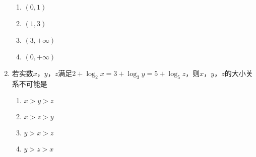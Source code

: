 \documentclass[UTF8]{ctexart}
\begin{document}
\begin{enumerate}
		\begin{enumerate}[label = A.]
			\item \((0,1)\)
			\item \((1,3)\)
			\item \((3,+\infty)\)
			\item \((0,+\infty)\)
		\end{enumerate}
		\item 若实数\(x\)，\(y\)，\(z\)满足\(2+\log_2 x = 3+\log_3 y = 5+\log_5 z\)，则\(x\)，\(y\)，\(z\)的大小关系不可能是
		\begin{enumerate}[label = A.]
			\item \(x > y > z\)
			\item \(x > z > y\)
			\item \(y > x > z\)
			\item \(y > z > x\)
		\end{enumerate}
	\end{enumerate}
	
\end{document}

